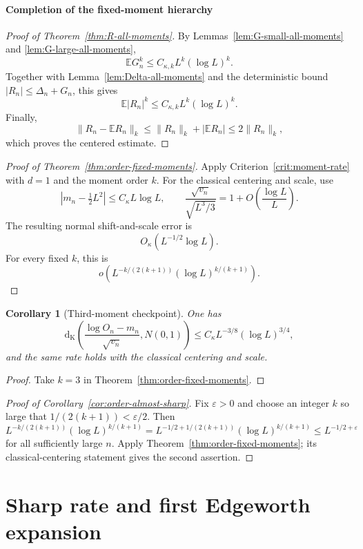 \documentclass[11pt]{article}
\newtheorem{corollary}[theorem]{Corollary}
\theoremstyle{remark}
\newcommand{\Ee}{\mathbb E}
\newcommand{\Kol}{\mathrm d_{\mathrm K}}
\begin{document}
\subsection{Completion of the fixed-moment hierarchy}

\begin{proof}[Proof of Theorem~\ref{thm:R-all-moments}]
By Lemmas~\ref{lem:G-small-all-moments} and
\ref{lem:G-large-all-moments},
\[
 \Ee G_n^k\le C_{\kappa,k}L^k(\log L)^k.
\]
Together with Lemma~\ref{lem:Delta-all-moments} and the deterministic bound
$|R_n|\le\Delta_n+G_n$, this gives
\[
 \Ee|R_n|^k\le C_{\kappa,k}L^k(\log L)^k.
\]
Finally,
\[
 \|R_n-\Ee R_n\|_k
 \le\|R_n\|_k+|\Ee R_n|
 \le2\|R_n\|_k,
\]
which proves the centered estimate.
\end{proof}

\begin{proof}[Proof of Theorem~\ref{thm:order-fixed-moments}]
Apply Criterion~\ref{crit:moment-rate} with $d=1$ and the moment order $k$.
For the classical centering and scale, use
\[
 |m_n-\tfrac12L^2|\le C_\kappa L\log L,
 \qquad
 \frac{\sqrt{v_n}}{\sqrt{L^3/3}}
 =1+O\!\left(\frac{\log L}{L}\right).
\]
The resulting normal shift-and-scale error is
\[
 O_\kappa(L^{-1/2}\log L).
\]
For every fixed $k$, this is
\[
 o\!\left(
 L^{-k/(2(k+1))}(\log L)^{k/(k+1)}
 \right).
\]
\end{proof}

\begin{corollary}[Third-moment checkpoint]
\label{cor:third-moment-checkpoint}
One has
\[
 \Kol\!\left(
 \frac{\log O_n-m_n}{\sqrt{v_n}},N(0,1)\right)
 \le C_\kappa L^{-3/8}(\log L)^{3/4},
\]
and the same rate holds with the classical centering and scale.
\end{corollary}

\begin{proof}
Take $k=3$ in Theorem~\ref{thm:order-fixed-moments}.
\end{proof}

\begin{proof}[Proof of Corollary~\ref{cor:order-almost-sharp}]
Fix $\varepsilon>0$ and choose an integer $k$ so large that
$1/(2(k+1))<\varepsilon/2$.  Then
\[
 L^{-k/(2(k+1))}(\log L)^{k/(k+1)}
 =L^{-1/2+1/(2(k+1))}(\log L)^{k/(k+1)}
 \le L^{-1/2+\varepsilon}
\]
for all sufficiently large $n$.  Apply
Theorem~\ref{thm:order-fixed-moments}; its classical-centering statement
gives the second assertion.
\end{proof}


\part{Sharp rate and first Edgeworth expansion}
\end{document}
